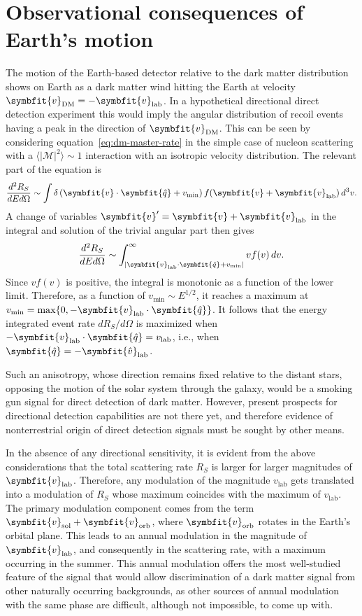 \documentclass[b5paper, 10pt, twoside]{book}
\renewcommand{\vec}[1]{\symbfit{#1}}
\newcommand{\ddder}[3]{\frac{d^2#1}{d#2d#3}}
\newcommand{\unitv}[1]{\symbfit{\hat{#1}}}
\newcommand{\difd}{\,d}
\newcommand{\tmean}[1]{\langle#1\rangle}
\begin{document}
\section{Observational consequences of Earth's motion}

The motion of the Earth-based detector relative to the dark matter distribution shows on Earth as a dark matter wind hitting the Earth at velocity $\vec{v}_\text{DM}=-\vec{v}_\text{lab}$. In a hypothetical directional direct detection experiment this would imply the angular distribution of recoil events having a peak in the direction of $\vec{v}_\text{DM}$. This can be seen by considering equation~\eqref{eq:dm-master-rate} in the simple case of nucleon scattering with a $\tmean{|\mathcal{M}|^2}\sim 1$ interaction with an isotropic velocity distribution. The relevant part of the equation is
\begin{equation}
    \ddder{R_S}{E}{\Omega}\sim\int\delta\left(\vec{v}\cdot\unitv{q}+v_\text{min}\right)f(\vec{v}+\vec{v}_\text{lab})\difd^3v.
\end{equation}
A change of variables $\vec{v}'=\vec{v}+\vec{v}_\text{lab}$ in the integral and solution of the trivial angular part then gives
\begin{equation}
    \ddder{R_S}{E}{\Omega}\sim\int_{|\vec{v}_\text{lab}\cdot\unitv{q}+v_\text{min}|}^\infty vf(v)\difd v.
    \label{eq:isotropic-rate}
\end{equation}
Since $vf(v)$ is positive, the integral is monotonic as a function of the lower limit. Therefore, as a function of $v_\text{min}\sim E^{1/2}$, it reaches a maximum at $v_\text{min}=\max\{0,-\vec{v}_\text{lab}\cdot\unitv{q}\}$. It follows that the energy integrated event rate $dR_S/d\Omega$ is maximized when $-\vec{v}_\text{lab}\cdot\unitv{q}=v_\text{lab}$, i.e., when $\unitv{q}=-\unitv{v}_\text{lab}$.

Such an anisotropy, whose direction remains fixed relative to the distant stars, opposing the motion of the solar system through the galaxy, would be a smoking gun signal for direct detection of dark matter. However, present prospects for directional detection capabilities are not there yet, and therefore evidence of nonterrestrial origin of direct detection signals must be sought by other means.

In the absence of any directional sensitivity, it is evident from the above considerations that the total scattering rate $R_S$ is larger for larger magnitudes of $\vec{v}_\text{lab}$. Therefore, any modulation of the magnitude $v_\text{lab}$ gets translated into a modulation of $R_S$ whose maximum coincides with the maximum of $v_\text{lab}$. The primary modulation component comes from the term $\vec{v}_\text{sol}+\vec{v}_\text{orb}$, where $\vec{v}_\text{orb}$ rotates in the Earth's orbital plane. This leads to an annual modulation in the magnitude of $\vec{v}_\text{lab}$, and consequently in the scattering rate, with a maximum occurring in the summer. This annual modulation offers the most well-studied feature of the signal that would allow discrimination of a dark matter signal from other naturally occurring backgrounds, as other sources of annual modulation with the same phase are difficult, although not impossible, to come up with.
\end{document}
